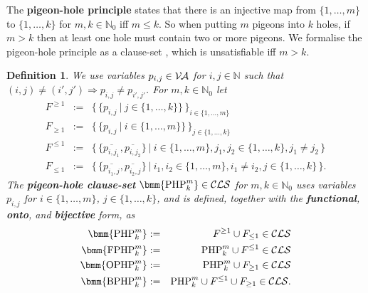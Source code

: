 \documentclass{report}
\newtheorem{defi}{Definition}[section]
\newcommand{\mb}{{\:|\:}} %
\newcommand{\set}[1]{\{ #1 \}}
\newcommand{\setb}[1]{\big \{ \, #1 \, \big \}}
\newcommand{\tb}[2]{\set{#1, \dots, #2}} %
\newcommand{\ol}{\overline}
\newcommand{\Ra}{\Rightarrow}
\newcommand{\mc}{\mathcal}
\newcommand{\NN}{\mathbb{N}}
\newcommand{\NNZ}{\NN_0}
\newcommand{\Va}{\mc{V\hspace{-0.1em}A}}
\newcommand{\Cls}{\mc{CLS}}
\newcommand{\php}{\mathrm{PHP}}
\newcommand{\fphp}{\mathrm{FPHP}} %
\newcommand{\ophp}{\mathrm{OPHP}} %
\newcommand{\ofphp}{\mathrm{BPHP}} %
\begin{document}
The \textbf{pigeon-hole principle} states that there is an injective map from $\tb1m$ to $\tb1k$ for $m,k \in \NNZ$ iff $m \le k$. So when putting $m$ pigeons into $k$ holes, if $m > k$ then at least one hole must contain two or more pigeons. We formalise the pigeon-hole principle as a clause-set \bmm{\php^m_k}, which is unsatisfiable iff $m > k$.
\begin{defi}\label{def:php}
  We use variables $p_{i,j} \in \Va$ for $i, j \in \NN$ such that $(i,j) \not= (i',j') \Ra p_{i,j} \not= p_{i',j'}$. For $m, k \in \NNZ$ let
  \begin{eqnarray*}
    F^{\ge 1} & := & \setb{\set{p_{i,j} \mb j \in \tb1k}}_{i \in \tb1m }\\
     F_{\ge 1} & := & \setb{\set{p_{i,j} \mb i \in \tb 1m}}_{j \in \tb 1k }\\
    F^{\le 1} & := & \setb{\set{\ol{p_{i,j_1}},\ol{p_{i,j_2}}} \mb i \in \tb 1m, j_1, j_2 \in \tb 1k, j_1 \not= j_2}\\
    F_{\le 1} & := & \setb{ \set{\ol{p_{i_1,j}},\ol{p_{i_2,j}}} \mb i_1,i_2 \in \tb1m, i_1 \not= i_2, j \in \tb1k }.
  \end{eqnarray*}
  The \textbf{pigeon-hole clause-set} $\bmm{\php^m_k} \in \Cls$ for $m,k \in \NNZ$ uses variables $p_{i,j}$ for $i \in \tb 1m$, $j \in \tb 1k$, and is defined, together with the \textbf{functional}, \textbf{onto}, and \textbf{bijective} form, as
  \begin{eqnarray*}
    \bmm{\php^m_k} & := & F^{\ge 1} \cup F_{\le 1} \in \Cls\\
    \bmm{\fphp^m_k} & := & \php^m_k \cup F^{\le 1} \in \Cls\\
    \bmm{\ophp^m_k} & := & \php^m_k \cup F_{\ge 1} \in \Cls\\
    \bmm{\ofphp^m_k} & := & \php^m_k \cup F^{\le 1} \cup F_{\ge 1} \in \Cls.
  \end{eqnarray*}
\end{defi}
\end{document}
